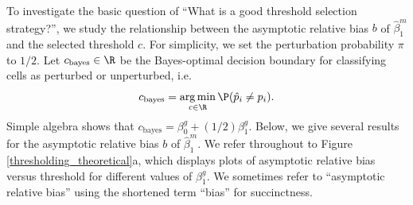 \documentclass[12pt]{article}
\DeclareMathOperator*{\argmin}{arg\,min}
\begin{document}
To investigate the basic question of ``What is a good threshold selection strategy?'', we study the relationship between the asymptotic relative bias $b$ of $\hat{\beta}^m_1$ and the selected threshold $c$. For simplicity, we set the perturbation probability $\pi$ to $1/2$. Let $c_\textrm{bayes} \in \R$ be the Bayes-optimal decision boundary for classifying cells as perturbed or unperturbed, i.e. $$c_\textrm{bayes} = \argmin_{c \in \R} \P(\hat{p}_i \neq p_i).$$ Simple algebra shows that $c_\textrm{bayes} = \beta_0^g + (1/2) \beta^g_1.$ Below, we give several results for the asymptotic relative bias $b$ of $\hat{\beta}^m_1$. We refer throughout to Figure \ref{thresholding_theoretical}a, which displays plots of asymptotic relative bias versus threshold for different values of $\beta^g_1$. We sometimes refer to ``asymptotic relative bias'' using the shortened term ``bias'' for succinctness.
\end{document}
